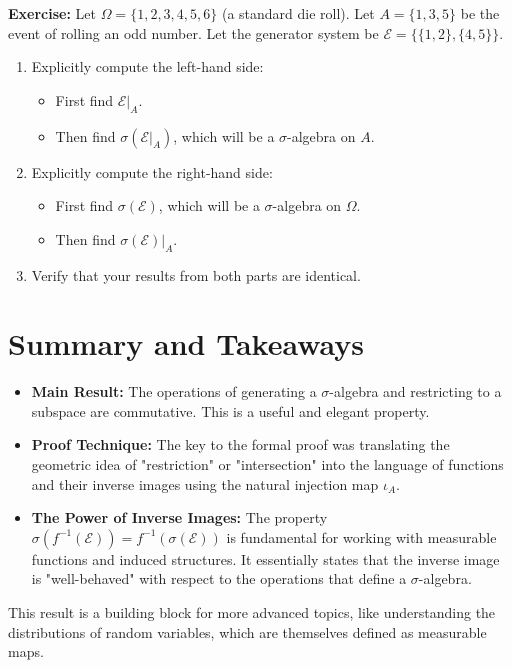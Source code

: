 \documentclass[11pt,a4paper]{article}
\begin{document}
\textbf{Exercise:} Let $\Omega = \{1, 2, 3, 4, 5, 6\}$ (a standard die roll). Let $A = \{1, 3, 5\}$ be the event of rolling an odd number. Let the generator system be $\mathcal{E} = \{\{1, 2\}, \{4, 5\}\}$.
\begin{enumerate}
    \item Explicitly compute the left-hand side:
    \begin{itemize}
        \item First find $\mathcal{E}|_A$.
        \item Then find $\sigma(\mathcal{E}|_A)$, which will be a $\sigma$-algebra on $A$.
    \end{itemize}
    \item Explicitly compute the right-hand side:
    \begin{itemize}
        \item First find $\sigma(\mathcal{E})$, which will be a $\sigma$-algebra on $\Omega$.
        \item Then find $\sigma(\mathcal{E})|_A$.
    \end{itemize}
    \item Verify that your results from both parts are identical.
\end{enumerate}

\section{Summary and Takeaways}

\begin{itemize}
    \item \textbf{Main Result:} The operations of generating a $\sigma$-algebra and restricting to a subspace are commutative. This is a useful and elegant property.
    \item \textbf{Proof Technique:} The key to the formal proof was translating the geometric idea of "restriction" or "intersection" into the language of functions and their inverse images using the natural injection map $\iota_A$.
    \item \textbf{The Power of Inverse Images:} The property $\sigma(f^{-1}(\mathcal{E})) = f^{-1}(\sigma(\mathcal{E}))$ is fundamental for working with measurable functions and induced structures. It essentially states that the inverse image is "well-behaved" with respect to the operations that define a $\sigma$-algebra.
\end{itemize}

This result is a building block for more advanced topics, like understanding the distributions of random variables, which are themselves defined as measurable maps.
\end{document}
